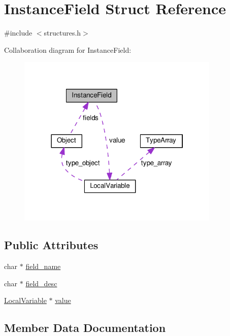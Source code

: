 \hypertarget{structInstanceField}{}\section{Instance\+Field Struct Reference}
\label{structInstanceField}


{\ttfamily \#include $<$structures.\+h$>$}



Collaboration diagram for Instance\+Field\+:
\nopagebreak
\begin{figure}[H]
\begin{center}
\leavevmode
\includegraphics[width=273pt]{structInstanceField__coll__graph}
\end{center}
\end{figure}
\subsection*{Public Attributes}
\begin{DoxyCompactItemize}
\item 
char $\ast$ \hyperlink{structInstanceField_a75b4828e1175de0f4368c5370d64eb6c}{field\+\_\+name}
\item 
char $\ast$ \hyperlink{structInstanceField_a5ee57ef4ae029c3b3dbb1e619ed0805d}{field\+\_\+desc}
\item 
\hyperlink{structLocalVariable}{Local\+Variable} $\ast$ \hyperlink{structInstanceField_aa37a1889a89600c93ce579a2e466e504}{value}
\end{DoxyCompactItemize}


\subsection{Member Data Documentation}
